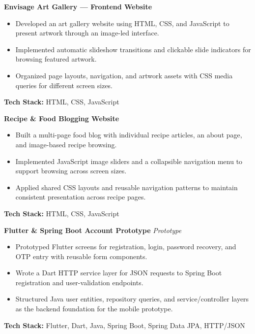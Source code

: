 \noindent\textbf{Envisage Art Gallery --- Frontend Website}
\begin{itemize}[leftmargin=*,nosep,topsep=3pt]
  \item Developed an art gallery website using HTML, CSS, and JavaScript to present artwork through an image-led interface.
  \item Implemented automatic slideshow transitions and clickable slide indicators for browsing featured artwork.
  \item Organized page layouts, navigation, and artwork assets with CSS media queries for different screen sizes.
\end{itemize}
\noindent\textbf{Tech Stack:} HTML, CSS, JavaScript\par\medskip

\noindent\textbf{Recipe \& Food Blogging Website}
\begin{itemize}[leftmargin=*,nosep,topsep=3pt]
  \item Built a multi-page food blog with individual recipe articles, an about page, and image-based recipe browsing.
  \item Implemented JavaScript image sliders and a collapsible navigation menu to support browsing across screen sizes.
  \item Applied shared CSS layouts and reusable navigation patterns to maintain consistent presentation across recipe pages.
\end{itemize}
\noindent\textbf{Tech Stack:} HTML, CSS, JavaScript\par\medskip

\noindent\textbf{Flutter \& Spring Boot Account Prototype} \hfill\textit{Prototype}
\begin{itemize}[leftmargin=*,nosep,topsep=3pt]
  \item Prototyped Flutter screens for registration, login, password recovery, and OTP entry with reusable form components.
  \item Wrote a Dart HTTP service layer for JSON requests to Spring Boot registration and user-validation endpoints.
  \item Structured Java user entities, repository queries, and service/controller layers as the backend foundation for the mobile prototype.
\end{itemize}
\noindent\textbf{Tech Stack:} Flutter, Dart, Java, Spring Boot, Spring Data JPA, HTTP/JSON\par\medskip


